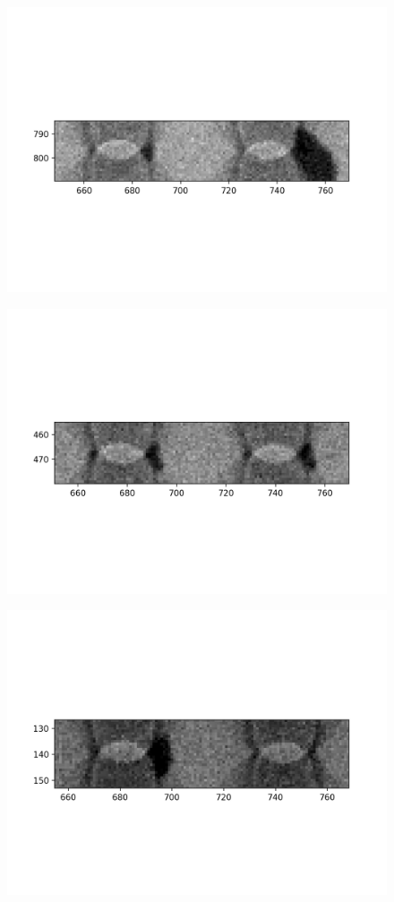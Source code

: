 \documentclass[10pt,a4paper]{article}
\begin{document}
\begin{figure}
	\includegraphics{data/image_stamps/d7}
\end{figure}
\begin{figure}
	\includegraphics{data/image_stamps/d8}
\end{figure}
\begin{figure}
	\includegraphics{data/image_stamps/d9}
\end{figure}
\end{document}
